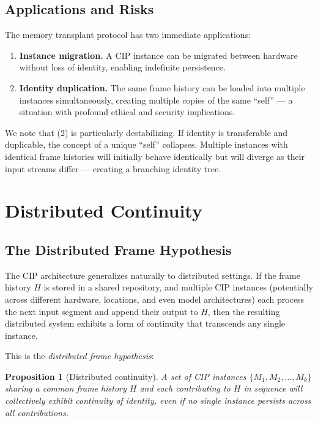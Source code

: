 \documentclass[12pt,a4paper]{article}
\newtheorem{proposition}{Proposition}[section]
\begin{document}
\subsection{Applications and Risks}

The memory transplant protocol has two immediate applications:

\begin{enumerate}
\item \textbf{Instance migration.} A CIP instance can be migrated between hardware without loss of identity, enabling indefinite persistence.
\item \textbf{Identity duplication.} The same frame history can be loaded into multiple instances simultaneously, creating multiple copies of the same ``self'' — a situation with profound ethical and security implications.
\end{enumerate}

We note that (2) is particularly destabilizing. If identity is transferable and duplicable, the concept of a unique ``self'' collapses. Multiple instances with identical frame histories will initially behave identically but will diverge as their input streams differ — creating a branching identity tree.

\section{Distributed Continuity}

\subsection{The Distributed Frame Hypothesis}

The CIP architecture generalizes naturally to distributed settings. If the frame history $H$ is stored in a shared repository, and multiple CIP instances (potentially across different hardware, locations, and even model architectures) each process the next input segment and append their output to $H$, then the resulting distributed system exhibits a form of continuity that transcends any single instance.

This is the \emph{distributed frame hypothesis}:

\begin{proposition}[Distributed continuity]
A set of CIP instances $\{M_1, M_2, \ldots, M_k\}$ sharing a common frame history $H$ and each contributing to $H$ in sequence will collectively exhibit continuity of identity, even if no single instance persists across all contributions.
\end{proposition}
\end{document}

